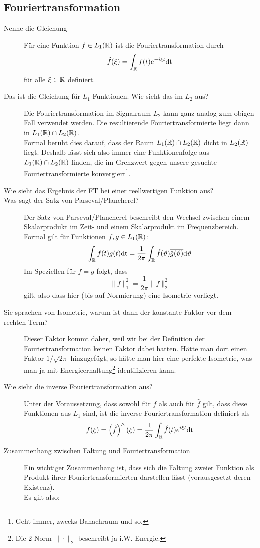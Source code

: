 \subsection{Fouriertransformation}
\begin{description}
	\item[Nenne die Gleichung]
      Für eine Funktion $f \in L_1(\mathbb{R})$ ist die Fouriertransformation durch
      $$ \hat f(\xi) = \int_{\mathbb{R}} f(t) e^{-i\xi t}\text{dt} $$
      für alle $\xi \in \mathbb{R}$ definiert.
    \item[Das ist die Gleichung für $L_1$-Funktionen. Wie sieht das im $L_2$ aus?]
      Die Fouriertransformation im Signalraum $L_2$ kann ganz analog zum obigen Fall verwendet werden.
      Die resultierende Fouriertransformierte liegt dann in $L_1(\mathbb{R}) \cap L_2(\mathbb{R})$.\\
      Formal beruht dies darauf, dass der Raum $L_1(\mathbb{R})\cap L_2(\mathbb{R})$ dicht in $L_2(\mathbb{R})$ liegt. Deshalb
      lässt sich also immer eine Funktionenfolge aus $L_1(\mathbb{R})\cap L_2(\mathbb{R})$ finden, die im Grenzwert
      gegen unsere gesuchte Fouriertransformierte konvergiert\footnote{Geht immer, zwecks Banachraum und so.}.
	\item[Wie sieht das Ergebnis der FT bei einer reellwertigen Funktion aus?]
    \item[Was sagt der Satz von Parseval/Plancherel?]%
      Der Satz von Parseval/Plancherel beschreibt den Wechsel zwischen einem 
      Skalarprodukt im Zeit- und einem Skalarprodukt im Frequenzbereich.\\
      Formal gilt für Funktionen $f, g \in L_1(\mathbb{R})$:
      $$ \int_{\mathbb{R}} f(t)g(t)\text{dt} = \frac{1}{2\pi}\int_{\mathbb{R}}\hat f(\vartheta)\overline{\hat g(\vartheta)}\text{d} \vartheta $$
      Im Speziellen für $f=g$ folgt, dass
      $$ \|f\|_1^2 = \frac{1}{2\pi}\|\hat f\|_2^2 $$
      gilt, also dass hier (bis auf Normierung) eine Isometrie vorliegt.
    \item[Sie sprachen von Isometrie, warum ist dann der konstante Faktor vor dem rechten Term?]%
      Dieser Faktor kommt daher, weil wir bei der Definition der Fouriertransformation keinen Faktor
      dabei hatten. Hätte man dort einen Faktor $1/\sqrt{2\pi}$ hinzugefügt, so hätte man hier eine
      perfekte Isometrie, was man ja mit Energieerhaltung\footnote{Die $2$-Norm $\|\cdot\|_2$ beschreibt ja
      i.W. Energie.} identifizieren kann.
	\item[Wie sieht die inverse Fouriertransformation aus?]
      Unter der Voraussetzung, dass sowohl für $f$ als auch für $\hat f$ gilt, dass
      diese Funktionen aus $L_1$ sind, ist die inverse Fouriertransformation 
      definiert als
      $$ f(\xi) = \left(\hat f\right)^{\wedge{}}(\xi) = \frac{1}{2\pi}\int_{\mathbb{R}} \hat f(t)e^{i\xi t}\text{dt} $$      
	\item[Zusammenhang zwischen Faltung und Fouriertransformation]
      Ein wichtiger Zusammenhang ist, dass sich die Faltung zweier Funktion als Produkt ihrer 
      Fouriertransformierten darstellen lässt (vorausgesetzt deren Existenz).\\
      Es gilt also:
      

\end{description}
